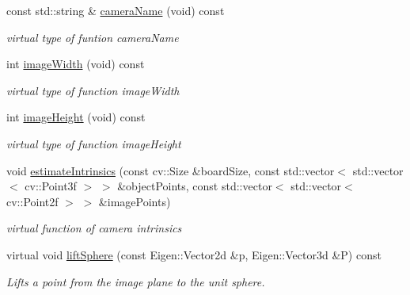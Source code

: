 \begin{DoxyCompactItemize}
const std\+::string \& \hyperlink{classcamodocal_1_1EquidistantCamera_a985ec4cd98fed18f5201551b24cf1d8b}{camera\+Name} (void) const
\begin{DoxyCompactList}\small\item\em virtual type of funtion camera\+Name \end{DoxyCompactList}\item 
\mbox{\label{classcamodocal_1_1EquidistantCamera_a90ff17672aca7c81cd56d8541cbb3190}} 
int \hyperlink{classcamodocal_1_1EquidistantCamera_a90ff17672aca7c81cd56d8541cbb3190}{image\+Width} (void) const
\begin{DoxyCompactList}\small\item\em virtual type of function image\+Width \end{DoxyCompactList}\item 
\mbox{\label{classcamodocal_1_1EquidistantCamera_a7db0d67a1c27897c04e3ae1635207433}} 
int \hyperlink{classcamodocal_1_1EquidistantCamera_a7db0d67a1c27897c04e3ae1635207433}{image\+Height} (void) const
\begin{DoxyCompactList}\small\item\em virtual type of function image\+Height \end{DoxyCompactList}\item 
\mbox{\label{classcamodocal_1_1EquidistantCamera_a07be015f3740cb23c1cdd87f3a4ba505}} 
void \hyperlink{classcamodocal_1_1EquidistantCamera_a07be015f3740cb23c1cdd87f3a4ba505}{estimate\+Intrinsics} (const cv\+::\+Size \&board\+Size, const std\+::vector$<$ std\+::vector$<$ cv\+::\+Point3f $>$ $>$ \&object\+Points, const std\+::vector$<$ std\+::vector$<$ cv\+::\+Point2f $>$ $>$ \&image\+Points)
\begin{DoxyCompactList}\small\item\em virtual function of camera intrinsics \end{DoxyCompactList}\item 
virtual void \hyperlink{classcamodocal_1_1EquidistantCamera_ac86c8527e09b6df4eea4fd3c1322ba00}{lift\+Sphere} (const Eigen\+::\+Vector2d \&p, Eigen\+::\+Vector3d \&P) const
\begin{DoxyCompactList}\small\item\em Lifts a point from the image plane to the unit sphere. \end{DoxyCompactList}\item 

\end{DoxyCompactItemize}
